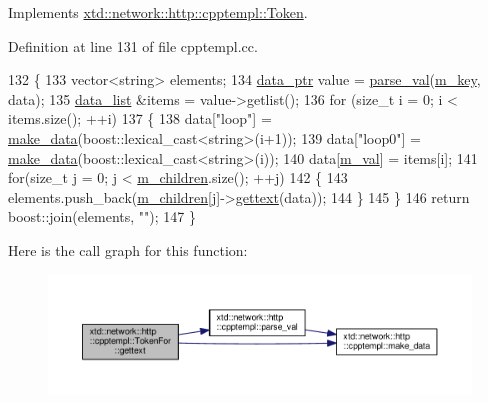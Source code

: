 Implements \hyperlink{classxtd_1_1network_1_1http_1_1cpptempl_1_1Token_a5aeb3ae0fe7478101eaaa90898709a1b}{xtd\+::network\+::http\+::cpptempl\+::\+Token}.



Definition at line 131 of file cpptempl.\+cc.


\begin{DoxyCode}
132 \{
133   vector<string> elements;
134   \hyperlink{namespacextd_1_1network_1_1http_1_1cpptempl_ad2f49991f1902699a98cf62bf0ae7ce6}{data\_ptr} value = \hyperlink{namespacextd_1_1network_1_1http_1_1cpptempl_af79d10d06cd5bc9ce629bb2d21fbcfd6}{parse\_val}(\hyperlink{classxtd_1_1network_1_1http_1_1cpptempl_1_1TokenFor_a30879f48f3ad6e5e61f6191a702743e4}{m\_key}, data);
135   \hyperlink{namespacextd_1_1network_1_1http_1_1cpptempl_aff1b51bcf8064f69c85dd4833c1853b4}{data\_list} &items = value->getlist();
136   \textcolor{keywordflow}{for} (\textcolor{keywordtype}{size\_t} i = 0; i < items.size(); ++i)
137   \{
138     data[\textcolor{stringliteral}{"loop"}] = \hyperlink{namespacextd_1_1network_1_1http_1_1cpptempl_a32fe5ec0914372b09492647a168dbbcb}{make\_data}(boost::lexical\_cast<string>(i+1));
139     data[\textcolor{stringliteral}{"loop0"}] = \hyperlink{namespacextd_1_1network_1_1http_1_1cpptempl_a32fe5ec0914372b09492647a168dbbcb}{make\_data}(boost::lexical\_cast<string>(i));
140     data[\hyperlink{classxtd_1_1network_1_1http_1_1cpptempl_1_1TokenFor_a262fbad437a0b5aeed05a73c315f865b}{m\_val}] = items[i];
141     \textcolor{keywordflow}{for}(\textcolor{keywordtype}{size\_t} j = 0; j < \hyperlink{classxtd_1_1network_1_1http_1_1cpptempl_1_1TokenFor_a2ee55240eafb3c90b7a0c96c0ad253a5}{m\_children}.size(); ++j)
142     \{
143       elements.push\_back(\hyperlink{classxtd_1_1network_1_1http_1_1cpptempl_1_1TokenFor_a2ee55240eafb3c90b7a0c96c0ad253a5}{m\_children}[j]->\hyperlink{classxtd_1_1network_1_1http_1_1cpptempl_1_1TokenFor_a27dde182755e5a44c3d11f1a1ed9aa65}{gettext}(data));
144     \}
145   \}
146   \textcolor{keywordflow}{return} boost::join(elements, \textcolor{stringliteral}{""});
147 \}
\end{DoxyCode}


Here is the call graph for this function\+:
\nopagebreak
\begin{figure}[H]
\begin{center}
\leavevmode
\includegraphics[width=350pt]{classxtd_1_1network_1_1http_1_1cpptempl_1_1TokenFor_a27dde182755e5a44c3d11f1a1ed9aa65_cgraph}
\end{center}
\end{figure}


